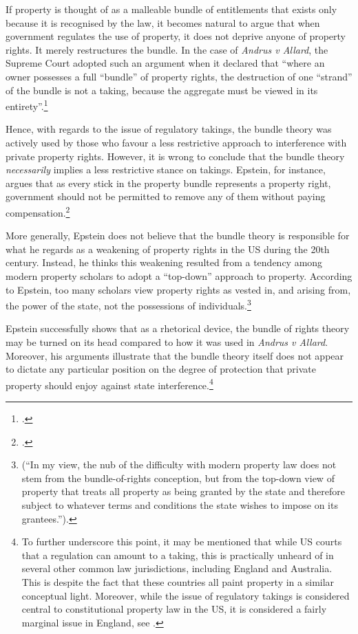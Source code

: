If property is thought of as a malleable bundle of entitlements that exists only because it is recognised by the law, it becomes natural to argue that when government regulates the use of property, it does not deprive anyone of property rights. It merely restructures the bundle. In the case of {\it Andrus v Allard}, the Supreme Court adopted such an argument when it declared that ``where an owner possesses a full ``bundle'' of property rights, the destruction of one ``strand'' of the bundle is not a taking, because the aggregate must be viewed in its entirety''.\footcite[65--66]{andrus79}

Hence, with regards to the issue of regulatory takings, the bundle theory was actively used by those who favour a less restrictive approach to interference with private property rights. However, it is wrong to conclude that the bundle theory {\it necessarily} implies a less restrictive stance on takings. Epstein, for instance, argues that as every stick in the property bundle represents a property right, government should not be permitted to remove any of them without paying compensation.\footcite[232-233]{epstein11} 

More generally, Epstein does not believe that the bundle theory is responsible for what he regards as a weakening of property rights in the US during the 20th century. Instead, he thinks this weakening resulted from a tendency among modern property scholars to adopt a ``top-down'' approach to property. According to Epstein, too many scholars view property rights as vested in, and arising from, the power of the state, not the possessions of individuals.\footnote{\cite[227-228]{epstein11} (``In my view, the nub of the difficulty with modern property law does not stem from the bundle-of-rights conception, but from the top-down view of property that treats all property as being granted by the state and therefore subject to whatever terms and conditions the state wishes to impose on its grantees.'').}

Epstein successfully shows that as a rhetorical device, the bundle of rights theory may be turned on its head compared to how it was used in {\it Andrus v Allard}. Moreover, his arguments illustrate that the bundle theory itself does not appear to dictate any particular position on the degree of protection that private property should enjoy against state interference.\footnote{To further underscore this point, it may be mentioned that while US courts  that a regulation can amount to a taking, this is practically unheard of in several other common law jurisdictions, including England and Australia. This is despite the fact that these countries all paint property in a similar conceptual light. Moreover, while the issue of regulatory takings is considered central to constitutional property law in the US, it is considered a fairly marginal issue in England, see \cite{purdue10}.}

